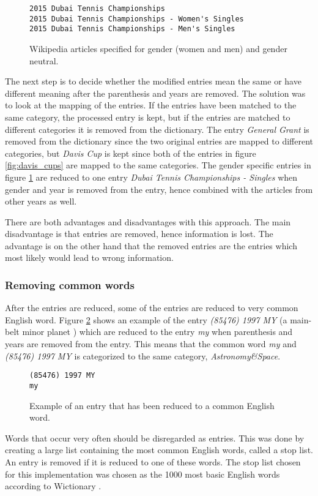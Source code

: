 \begin{figure}[h]
\centering
\begin{lstlisting}
2015 Dubai Tennis Championships
2015 Dubai Tennis Championships - Women's Singles
2015 Dubai Tennis Championships - Men's Singles
\end{lstlisting}
\caption{Wikipedia articles specified for gender (women and men) and gender neutral.}
\label{fig:dubai_gender}
\end{figure}

The next step is to decide whether the modified entries mean the same or have different meaning after the parenthesis and years are removed. The solution was to look at the mapping of the entries. If the entries have been matched to the same category, the processed entry is kept, but if the entries are matched to different categories it is removed from the dictionary. The entry \emph{General Grant} is removed from the dictionary since the two original entries are mapped to different categories, but \emph{Davis Cup} is kept since both of the entries in figure \ref{fig:davis_cups} are mapped to the same categories. The gender specific entries in figure \ref{fig:dubai_gender} are reduced to one entry \emph{Dubai Tennis Championships - Singles} when gender and year is removed from the entry, hence combined with the articles from other years as well.

There are both advantages and disadvantages with this approach. The main disadvantage is that entries are removed, hence information is lost. The advantage is on the other hand that the removed entries are the entries which most likely would lead to wrong information. 

\subsubsection{Removing common words}
After the entries are reduced, some of the entries are reduced to very common English word. Figure \ref{fig:common_word} shows an example of the entry  \emph{(85476) 1997 MY} (a main-belt minor planet \cite{wiki:myplanet}) which are reduced to the entry \emph{my} when parenthesis and years are removed from the entry. This means that the common word \emph{my} and  \emph{(85476) 1997 MY} is categorized to the same category, \emph{Astronomy\&Space}. 

\begin{figure}[h]
\centering
\begin{lstlisting}
(85476) 1997 MY
my
\end{lstlisting}
\caption{Example of an entry that has been reduced to a common English word. }
\label{fig:common_word}
\end{figure}

Words that occur very often should be disregarded as entries. This was done by creating a large list containing the most common English words, called a stop list. An entry is removed if it is reduced to one of these words. The stop list chosen for this implementation was chosen as the 1000 most basic English words according to Wictionary \cite{wiki:freqwordlist}. 

